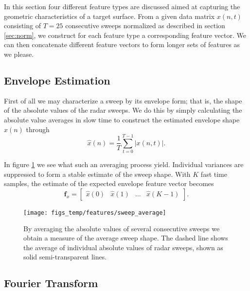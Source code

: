 In this section four different feature types are discussed aimed at capturing the geometric characteristics of a target surface. From a given data matrix $x(n,t)$ consisting of $T=25$ consecutive sweeps normalized as described in section \ref{sec:norm}, we construct for each feature type a corresponding feature vector. We can then concatenate different feature vectors to form longer sets of features as we please.  

\subsection{Envelope Estimation}

First of all we may characterize a sweep by its envelope form; that is, the shape of the absolute values of the radar sweeps. We do this by simply calculating the absolute value averages in slow time to construct the estimated envelope shape $\hat{x}(n)$ through
\begin{equation}
	\hat{x}(n) = \frac{1}{T}\sum_{t=0}^{T-1}|x(n, t)|.
\end{equation}

In figure \ref{fig:sweep_average} we see what such an averaging process yield. Individual variances are suppressed to form a stable estimate of the sweep shape. With $K$ fast time samples, the estimate of the expected envelope feature vector becomes 
\begin{equation}
	\mathbf{f}_{x} = 
	\begin{bmatrix}
		\hat{x}(0) & \hat{x}(1) & ... & \hat{x}(K-1)
	\end{bmatrix}.
\end{equation}

\begin{figure}[h]
	\centering
	\texttt{[image: figs\_temp/features/sweep\_average]}
	\caption{By averaging the absolute values of several consecutive sweeps we obtain a measure of the average sweep shape. The dashed line shows the average of individual absolute values of radar sweeps, shown as solid semi-transparent lines.}
	\label{fig:sweep_average}
\end{figure}


\subsection{Fourier Transform}

